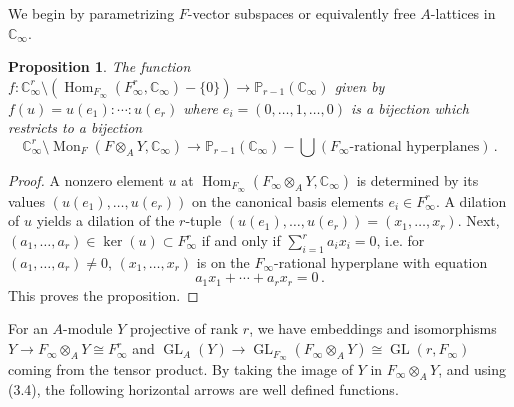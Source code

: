 \documentclass[12pt,a4paper]{article}
\theoremstyle{plain}
\newtheorem{proposition}{Proposition}[section]
\theoremstyle{definition}
\theoremstyle{remark}
\DeclareMathOperator{\Hom}{Hom}
\DeclareMathOperator{\Mon}{Mon}
\DeclareMathOperator{\GL}{GL}
\begin{document}
We begin by parametrizing $F$-vector subspaces or equivalently free 
$A$-lattices in $\mathbb{C}_\infty$.

\begin{proposition}
The function $f\colon \mathbb{C}_\infty^r \setminus (\Hom_{F_\infty}(F_\infty^r, \mathbb{C}_\infty) - \{0\}) \to \mathbb{P}_{r-1}(\mathbb{C}_\infty)$ 
given by $f(u) = u(e_1) : \cdots : u(e_r)$ where $e_i = (0, \ldots, 1, \ldots, 0)$ 
is a bijection which restricts to a bijection
\[
\mathbb{C}_\infty^r \setminus \Mon_F(F \otimes_A Y, \mathbb{C}_\infty) \longrightarrow \mathbb{P}_{r-1}(\mathbb{C}_\infty) - \bigcup(\text{$F_\infty$-rational hyperplanes}) \,.
\]
\end{proposition}

\begin{proof}
A nonzero element $u$ at $\Hom_{F_\infty}(F_\infty \otimes_A Y, \mathbb{C}_\infty)$ 
is determined by its values $(u(e_1), \ldots, u(e_r))$ on the canonical basis 
elements $e_i \in F_\infty^r$. A dilation of $u$ yields a dilation of the 
$r$-tuple $(u(e_1), \ldots, u(e_r)) = (x_1, \ldots, x_r)$. Next, 
$(a_1, \ldots, a_r) \in \ker(u) \subset F_\infty^r$ if and only if 
$\sum_{i=1}^r a_i x_i = 0$, i.e. for $(a_1, \ldots, a_r) \neq 0$, 
$(x_1, \ldots, x_r)$ is on the $F_\infty$-rational hyperplane with equation
\[
a_1 x_1 + \cdots + a_r x_r = 0 \,.
\]
This proves the proposition.
\end{proof}

For an $A$-module $Y$ projective of rank $r$, we have embeddings and 
isomorphisms $Y \to F_\infty \otimes_A Y \cong F_\infty^r$ and 
$\GL_A(Y) \to \GL_{F_\infty}(F_\infty \otimes_A Y) \cong \GL(r, F_\infty)$ 
coming from the tensor product. By taking the image of $Y$ in 
$F_\infty \otimes_A Y$, and using (3.4), the following horizontal arrows are 
well defined functions.
\end{document}
